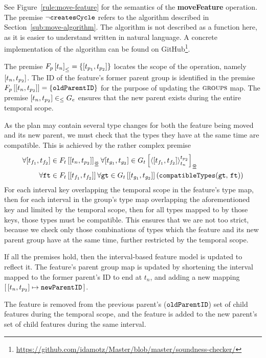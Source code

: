 See Figure~\vref{rule:move-feature} for the semantics of the \textbf{moveFeature} operation. The premise $\neg \texttt{createsCycle}$ refers to the algorithm described in Section~\vref{sub:move-algorithm}. The algorithm is not described as a function here, as it is easier to understand written in natural language. A concrete implementation of the algorithm can be found on GitHub\footnote{\url{https://github.com/idamotz/Master/blob/master/soundness-checker/}}. 

The premise $\containing{F_p}{t_n} = \set{\interval{t_{p_1}}{t_{p_2}}}$ locates the scope of the operation, namely $\interval{t_n}{t_{p_2}}$. The ID of the feature's former parent group is identified in the premise $\lookup{F_p}{\interval{t_n}{t_{p_2}}} = \set{\var{oldParentID}}$ for the purpose of updating the $\textsc{groups}{}{}$ map. The premise $\interval{t_n}{t_{p_2}} \inn G_e$ ensures that the new parent exists during the entire temporal scope.

As the plan may contain several type changes for both the feature being moved and its new parent, we must check that the types they have at the same time are compatible. This is achieved by the rather complex premise
\begin{align*}
  \forall \interval{t_{f_1}}{t_{f_2}} & \in \overlapping{F_t}{t_n}{t_{p_2}}
  \forall \interval{t_{g_1}}{t_{g_2}} \in \lookup{G_t}{\clamp{\interval{t_{f_1}}{t_{f_2}}}{t_n}{t_{p_2}}}_{\overlap{}} \\
  \forall \var{ft} & \in \lookup{F_t}{\interval{t_{f_1}}{t_{f_2}}}
  \forall \var{gt} \in \lookup{G_t}{\interval{t_{g_1}}{t_{g_2}}}
  \left(\var{compatibleTypes}(\var{gt},\, \var{ft}) \right)
\end{align*}
For each interval key overlapping the temporal scope in the feature's type map, then for each interval in the group's type map overlapping the aforementioned key and limited by the temporal scope, then for all types mapped to by those keys, those types must be compatible. This ensures that we are not too strict, because we check only those combinations of types which the feature and its new parent group have at the same time, further restricted by the temporal scope.

If all the premises hold, then the interval-based feature model is updated to reflect it. The feature's parent group map is updated by shortening the interval mapped to the former parent's ID to end at $t_n$, and adding a new mapping $\intervalmapping{t_n}{t_{p_2}}{\var{newParentID}}$.

The feature is removed from the previous parent's ($\texttt{oldParentID}$) set of child features during the temporal scope, and the feature is added to the new parent's set of child features during the same interval. 

